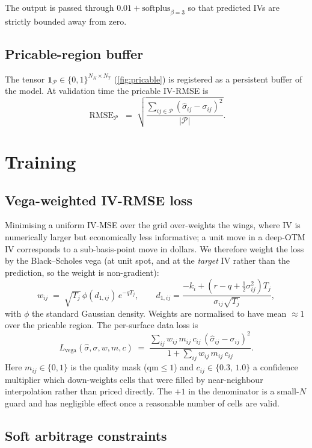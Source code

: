 \documentclass[11pt,a4paper]{article}
\DeclareMathOperator{\RMSE}{RMSE}
\begin{document}
The output is passed through $0.01 + \mathrm{softplus}_{\beta=3}$ so
that predicted IVs are strictly bounded away from zero.

\subsection{Pricable-region buffer}
The tensor $\mathbf{1}_{\mathcal{P}}\in\{0,1\}^{N_K\times N_T}$
(\cref{fig:pricable}) is registered as a persistent buffer of the model.
At validation time the pricable IV-RMSE is
\[
  \RMSE_{\mathcal{P}} \;=\; \sqrt{\frac{\sum_{ij\in\mathcal{P}} (\hat\sigma_{ij}-\sigma_{ij})^2}{|\mathcal{P}|}}.
\]

\section{Training}
\label{sec:training}

\subsection{Vega-weighted IV-RMSE loss}

Minimising a uniform IV-MSE over the grid over-weights the wings,
where IV is numerically larger but economically less informative; a
unit move in a deep-OTM IV corresponds to a sub-basis-point move in
dollars. We therefore weight the loss by the Black--Scholes vega (at
unit spot, and at the \emph{target} IV rather than the prediction, so
the weight is non-gradient):
\[
  w_{ij} \;=\; \sqrt{T_j}\,\phi(d_{1,ij})\,e^{-qT_j},
  \qquad d_{1,ij} = \frac{-k_i + (r-q+\tfrac{1}{2}\sigma_{ij}^2)T_j}{\sigma_{ij}\sqrt{T_j}},
\]
with $\phi$ the standard Gaussian density. Weights are normalised to
have mean $\approx 1$ over the pricable region. The per-surface data
loss is
\begin{equation}
  L_{\text{vega}}(\hat\sigma,\sigma,w,m,c)
  \;=\; \frac{\sum_{ij} w_{ij}\,m_{ij}\,c_{ij}\,(\hat\sigma_{ij}-\sigma_{ij})^2}
             {1 + \sum_{ij} w_{ij}\,m_{ij}\,c_{ij}}.
  \label{eq:vega-loss}
\end{equation}
Here $m_{ij}\in\{0,1\}$ is the quality mask ($\mathrm{qm}\le1$) and
$c_{ij}\in\{0.3,\,1.0\}$ a confidence multiplier which down-weights
cells that were filled by near-neighbour interpolation rather than
priced directly. The $+1$ in the denominator is a small-$N$ guard and
has negligible effect once a reasonable number of cells are valid.

\subsection{Soft arbitrage constraints}
\end{document}
